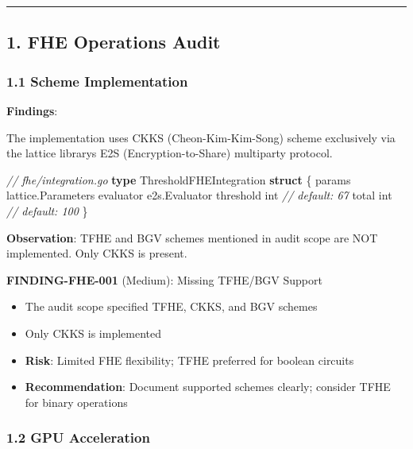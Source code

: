\documentclass[
]{article}
\newenvironment{Shaded}{}{}
\newcommand{\CommentTok}[1]{\textcolor[rgb]{0.38,0.63,0.69}{\textit{#1}}}
\newcommand{\DataTypeTok}[1]{\textcolor[rgb]{0.56,0.13,0.00}{#1}}
\newcommand{\KeywordTok}[1]{\textcolor[rgb]{0.00,0.44,0.13}{\textbf{#1}}}
\newcommand{\NormalTok}[1]{#1}
\newcommand{\OperatorTok}[1]{\textcolor[rgb]{0.40,0.40,0.40}{#1}}
\providecommand{\tightlist}{%
  \setlength{\itemsep}{0pt}\setlength{\parskip}{0pt}}
\begin{document}
\begin{center}\rule{0.5\linewidth}{0.5pt}\end{center}

\subsection{1. FHE Operations Audit}\label{1-fhe-operations-audit}

\subsubsection{1.1 Scheme
Implementation}\label{11-scheme-implementation}

\textbf{Findings}:

The implementation uses CKKS (Cheon-Kim-Kim-Song) scheme exclusively via
the lattice library\textquotesingle s E2S (Encryption-to-Share)
multiparty protocol.

\begin{Shaded}
\begin{Highlighting}[]
\CommentTok{// fhe/integration.go}
\KeywordTok{type}\NormalTok{ ThresholdFHEIntegration }\KeywordTok{struct} \OperatorTok{\{}
\NormalTok{    params    lattice}\OperatorTok{.}\NormalTok{Parameters}
\NormalTok{    evaluator e2s}\OperatorTok{.}\NormalTok{Evaluator}
\NormalTok{    threshold }\DataTypeTok{int}  \CommentTok{// default: 67}
\NormalTok{    total     }\DataTypeTok{int}  \CommentTok{// default: 100}
\OperatorTok{\}}
\end{Highlighting}
\end{Shaded}

\textbf{Observation}: TFHE and BGV schemes mentioned in audit scope are
NOT implemented. Only CKKS is present.

\textbf{FINDING-FHE-001} (Medium): Missing TFHE/BGV Support

\begin{itemize}
\tightlist
\item
  The audit scope specified TFHE, CKKS, and BGV schemes
\item
  Only CKKS is implemented
\item
  \textbf{Risk}: Limited FHE flexibility; TFHE preferred for boolean
  circuits
\item
  \textbf{Recommendation}: Document supported schemes clearly; consider
  TFHE for binary operations
\end{itemize}

\subsubsection{1.2 GPU Acceleration}\label{12-gpu-acceleration}
\end{document}
